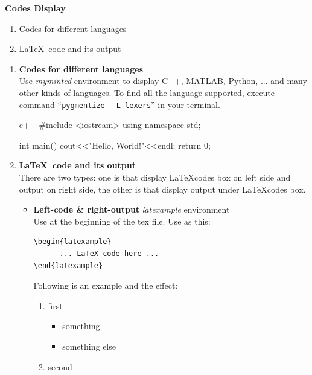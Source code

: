 \begin{problem}[3]
	\textbf{Codes Display}
	\begin{enumerate}[nosep,label=(\arabic*)]
	\item Codes for different languages
	\item \LaTeX \ code and its output
	\end{enumerate}
\end{problem}

\begin{solution}
	\begin{enumerate}[nosep,label=(\arabic*)]
	\item \textbf{Codes for different languages} \\
		Use \textit{myminted} environment to display C++, MATLAB, Python, ... and many other kinds of languages. To find all the language supported, execute command ``\verb|pygmentize| \verb| -L lexers|'' in your terminal.\\
\begin{latexample}[]
\begin{myminted}{c++}
#include <iostream>
using namespace std;

int main()
{
  cout<<"Hello, World!"<<endl;
  return 0;
}
\end{myminted}
\end{latexample}

	\item \textbf{\LaTeX \ code and its output} \\
		There are two types: one is that display \LaTeX codes box on left side and output on right side, the other is that display output under \LaTeX codes box.
		\begin{itemize}
			\item \textbf{Left-code \& right-output} \cndash \textit{latexample} environment \\
				Use \verb++ at the beginning of the tex file. Use as this:
\begin{verbatim}
\begin{latexample}
	  ... LaTeX code here ...
\end{latexample}
\end{verbatim}
				Following is an example\label{enum} and the effect: \\
\begin{latexample}[]
\begin{enumerate}[nosep,label=(\arabic*)]
  \item first
    \begin{itemize}
	  \item something
	  \item something else
	\end{itemize}
  \item second
\end{enumerate}
\end{latexample}


\end{itemize}
\end{enumerate}
\end{solution}
